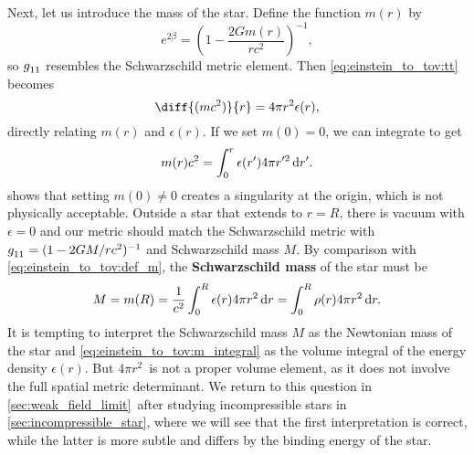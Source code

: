 Next, let us introduce the mass of the star.
Define the function $m(r)$ by
\begin{equation}
	e^{2 \beta} = \left( 1 - \frac{2 G m(r)}{r c^2} \right)^{-1} ,
	\label{eq:einstein_to_tov:def_m}
\end{equation}
so $g\indices{_1_1}$ resembles the Schwarzschild metric element.
Then \cref{eq:einstein_to_tov:tt} becomes
\begin{equation}
	\diff{(m c^2)}{r} = 4 \pi r^2 \epsilon(r) ,
	\label{eq:einstein_to_tov:m_rho}
\end{equation}
directly relating $m(r)$ and $\epsilon(r)$.
If we set $m(0) = 0$, we can integrate to get
\begin{equation}
	m(r) c^2 = \integral{\epsilon(r') 4 \pi r'^2}{r'}{0}{r} .
	\label{eq:einstein_to_tov:m_integral}
\end{equation}
\cite[page 602]{ref:mtw} shows that setting $m(0) \neq 0$ creates a singularity at the origin, which is not physically acceptable.
Outside a star that extends to $r = R$, there is vacuum with $\epsilon = 0$ and our metric should match the Schwarzschild metric with $g\indices{_1_1} = (1-2GM/rc^2)^{-1}$ and Schwarzschild mass $M$.
By comparison with \cref{eq:einstein_to_tov:def_m}, the \textbf{Schwarzschild mass} of the star must be
\begin{equation}
	M = m(R) = \frac{1}{c^2} \integral{\epsilon(r) 4 \pi r^2}{r}{0}{R} = \integral{\rho(r) 4 \pi r^2}{r}{0}{R}.
	\label{eq:einstein_to_tov:schwarzschild_mass}
\end{equation}
It is tempting to interpret the Schwarzschild mass $M$ as the Newtonian mass of the star and \eqref{eq:einstein_to_tov:m_integral} as the volume integral of the energy density $\epsilon(r)$.
But $4 \pi r^2$ is not a proper volume element, as it does not involve the full spatial metric determinant.
We return to this question in \cref{sec:weak_field_limit} after studying incompressible stars in \cref{sec:incompressible_star}, where we will see that the first interpretation is correct, while the latter is more subtle and differs by the binding energy of the star.


